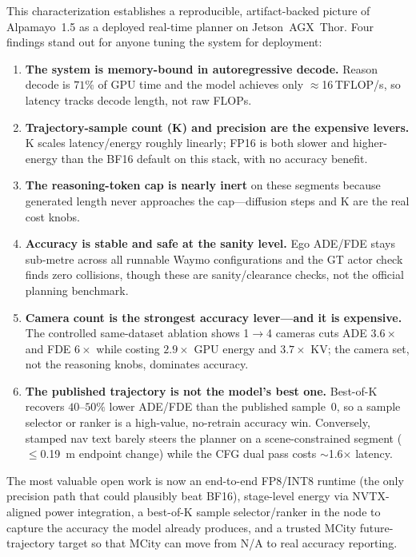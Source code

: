 \documentclass[11pt,a4paper]{article}
\begin{document}
This characterization establishes a reproducible, artifact-backed picture of
Alpamayo~1.5 as a deployed real-time planner on Jetson~AGX~Thor. Four findings
stand out for anyone tuning the system for deployment:
\begin{enumerate}
  \item \textbf{The system is memory-bound in autoregressive decode.} Reason
  decode is $71\%$ of GPU time and the model achieves only $\approx$16\,TFLOP/s,
  so latency tracks decode length, not raw FLOPs.
  \item \textbf{Trajectory-sample count (K) and precision are the expensive
  levers.} K scales latency/energy roughly linearly; FP16 is both slower and
  higher-energy than the BF16 default on this stack, with no accuracy benefit.
  \item \textbf{The reasoning-token cap is nearly inert} on these segments because
  generated length never approaches the cap---diffusion steps and K are the real
  cost knobs.
  \item \textbf{Accuracy is stable and safe at the sanity level.} Ego ADE/FDE
  stays sub-metre across all runnable Waymo configurations and the GT actor check
  finds zero collisions, though these are sanity/clearance checks, not the
  official planning benchmark.
  \item \textbf{Camera count is the strongest accuracy lever---and it is
  expensive.} The controlled same-dataset ablation shows 1$\to$4 cameras cuts ADE
  $3.6\times$ and FDE $6\times$ while costing $2.9\times$ GPU energy and
  $3.7\times$ KV; the camera set, not the reasoning knobs, dominates accuracy.
  \item \textbf{The published trajectory is not the model's best one.} Best-of-K
  recovers $40$--$50\%$ lower ADE/FDE than the published sample~0, so a sample
  selector or ranker is a high-value, no-retrain accuracy win. Conversely,
  stamped nav text barely steers the planner on a scene-constrained segment
  ($\le$\SI{0.19}{\metre} endpoint change) while the CFG dual pass costs
  $\sim$1.6$\times$ latency.
\end{enumerate}
The most valuable open work is now an end-to-end FP8/INT8 runtime (the only
precision path that could plausibly beat BF16), stage-level energy via
NVTX-aligned power integration, a best-of-K sample selector/ranker in the node to
capture the accuracy the model already produces, and a trusted MCity
future-trajectory target so that MCity can move from N/A to real accuracy
reporting.
\end{document}
